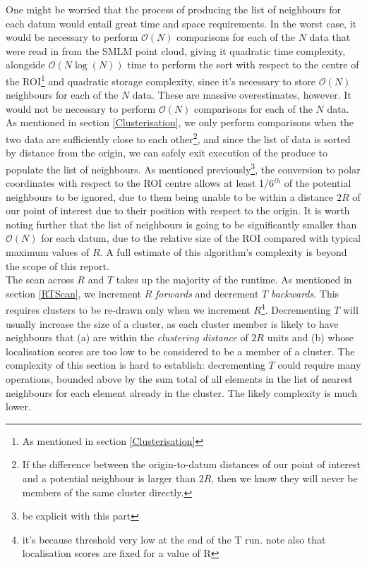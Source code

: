 \documentclass[11pt]{article}
\newcommand{\on}{\mathcal{O}(N)}
\begin{document}
One might be worried that the process of producing the list of neighbours for each datum would entail great time and space requirements. In the worst case, it would be necessary to perform $\mathcal{O}(N)$ comparisons for each of the $N$ data that were read in from the SMLM point cloud, giving it quadratic time complexity, alongside $\mathcal{O}(N\log(N))$ time to perform the sort with respect to the centre of the ROI\footnote{As mentioned in section \ref{Clusterisation}} and quadratic storage complexity, since it's necessary to store $\mathcal{O}(N)$ neighbours for each of the $N$ data. These are massive overestimates, however. It would not be necessary to perform $\on$ comparisons for each of the $N$ data. As mentioned in section \ref{Clusterisation}, we only perform comparisons when the two data are sufficiently close to each other\footnote{If the difference between the origin-to-datum distances of our point of interest and a potential neighbour is larger than $2R$, then we know they will never be members of the same cluster directly. }, and since the list of data is sorted by distance from the origin, we can safely exit execution of the produce to populate the list of neighbours. As mentioned previously\footnote{be explicit with this part}, the conversion to polar coordinates with respect to the ROI centre allows at least 1/6$^{th}$ of the potential neighbours to be ignored, due to them being unable to be within a distance $2R$ of our point of interest due to their position with respect to the origin. It is worth noting further that the list of neighbours is going to be significantly smaller than $\on$ for each datum, due to the relative size of the ROI compared with typical maximum values of $R$. A full estimate of this algorithm's complexity is beyond the scope of this report. \\

The scan across $R$ and $T$ takes up the majority of the runtime. As mentioned in section \ref{RTScan}, we increment $R$ \textit{forwards} and decrement $T$ \textit{backwards}. This requires clusters to be re-drawn only when we increment $R$\footnote{it's because threshold very low at the end of the T run. note also that localisation scores are fixed for a value of R}. Decrementing $T$ will usually increase the size of a cluster, as each cluster member is likely to have neighbours that (a) are within the \textit{clustering distance} of $2R$ units and (b) whose localisation scores are too low to be considered to be a member of a cluster. The complexity of this section is hard to establish: decrementing $T$ could require many operations, bounded above by the sum total of all elements in the list of nearest neighbours for each element already in the cluster. The likely complexity is much lower. \\
\end{document}
